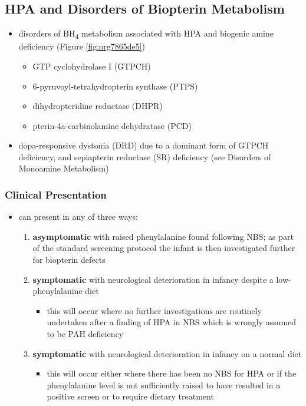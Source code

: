 \documentclass[12pt]{scrartcl}
\begin{document}
\subsection{HPA and Disorders of Biopterin Metabolism}
\label{sec:org3459d9e}
\begin{itemize}
\item disorders of BH\textsubscript{4} metabolism associated with HPA and biogenic amine deficiency (Figure \ref{fig:org7865de5})
\begin{itemize}
\item GTP cyclohydrolase I (GTPCH)
\item 6-pyruvoyl-tetrahydropterin synthase (PTPS)
\item dihydropteridine reductase (DHPR)
\item pterin-4a-carbinolamine dehydratase (PCD)
\end{itemize}
\item dopa-responsive dystonia (DRD) due to a dominant form of GTPCH
deficiency, and sepiapterin reductase (SR) deficiency (see Disorders of Monoamine Metabolism)
\end{itemize}
\subsubsection{Clinical Presentation}
\label{sec:org2184c73}
\begin{itemize}
\item can present in any of three ways:
\begin{enumerate}
\item \textbf{asymptomatic} with raised phenylalanine found following NBS; as part of
the standard screening protocol the infant is then investigated
further for biopterin defects
\item \textbf{symptomatic} with neurological deterioration in infancy despite a
low-phenylalanine diet
\begin{itemize}
\item this will occur where no further investigations are routinely
undertaken after a finding of HPA in NBS which is wrongly
assumed to be PAH deficiency
\end{itemize}
\item \textbf{symptomatic} with neurological deterioration in infancy on a
normal diet
\begin{itemize}
\item this will occur either where there has been no NBS for HPA or
if the phenylalanine level is not sufficiently raised to have
resulted in a positive screen or to require dietary treatment
\end{itemize}
\end{enumerate}
\end{itemize}
\end{document}
